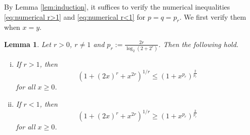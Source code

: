 \documentclass[reqno, 10pt]{amsart}
\theoremstyle{plain}
\numberwithin{equation}{section}
\newtheorem{lemma}[theorem]{Lemma}
\theoremstyle{definition}
\newtheorem*{induction hypothesis}{Induction hypothesis}
\theoremstyle{remark}
\begin{document}
By Lemma \ref{lem:induction}, it suffices to verify the numerical inequalities \eqref{eq:numerical r>1} and \eqref{eq:numerical r<1} for $p=q=p_r$.  We first verify them when $x=y$. 

\begin{lemma}\label{lem:numerical f f p p}
    Let $r >0$, $r \neq 1$ and $p_r:=\frac{2r}{\log_2(2+2^r)}$. 
    Then the following hold.
    \begin{enumerate}[(i)]
        \item If $r > 1$, then
            \begin{equation}\label{eq:numerical f*f p p}
                (1+(2x)^{r}+x^{2r})^{1/r}\leq (1+x^{p_r})^{\frac{2}{p_r}}        
            \end{equation}
            for all $x \geq 0$.
        \item If $r < 1$, then
            \begin{equation}\label{eq:numerical f*f p p r < 1}
                (1+(2x)^{r}+x^{2r})^{1/r}\geq (1+x^{p_r})^{\frac{2}{p_r}}        
            \end{equation}
            for all $x \geq 0$.
    \end{enumerate}
\end{lemma}
\end{document}
